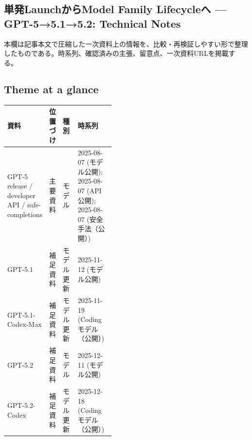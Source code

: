 \subsection*{単発LaunchからModel Family Lifecycleへ — GPT-5→5.1→5.2: Technical Notes}
本欄は記事本文で圧縮した一次資料上の情報を、比較・再検証しやすい形で整理したものである。時系列、確認済みの主張、留意点、一次資料URLを掲載する。
\medskip
\subsection*{Theme at a glance}
\begin{center}
\footnotesize
\begin{tabularx}{\linewidth}{@{}p{0.20\linewidth}p{0.10\linewidth}p{0.14\linewidth}X@{}}
\toprule
資料 & 位置づけ & 種別 & 時系列 \\
\midrule
GPT-5 release / developer API / safe-completions & 主要資料 & モデル & 2025-08-07 (モデル公開); 2025-08-07 (API公開); 2025-08-07 (安全手法（公開）)    \\
GPT-5.1 & 補足資料 & モデル更新 & 2025-11-12 (モデル公開)    \\
GPT-5.1-Codex-Max & 補足資料 & モデル更新 & 2025-11-19 (Codingモデル（公開）)    \\
GPT-5.2 & 補足資料 & モデル & 2025-12-11 (モデル公開)    \\
GPT-5.2-Codex & 補足資料 & モデル更新 & 2025-12-18 (Codingモデル（公開）)    \\
\bottomrule
\end{tabularx}
\end{center}
\normalsize

